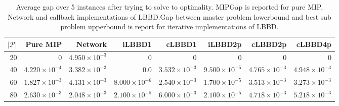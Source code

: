 \begin{table*}
    \centering
    \caption{Average gap over 5 instances after trying to solve to optimality. MIPGap is reported for pure MIP, Network and callback implementations of LBBD.\@ Gap between master problem lowerbound and best sub problem upperbound is report for iterative implementations of LBBD.}
    \begin{tabular}{rrrrrrrr} \toprule
        $|\mathcal{P}|$ & Pure MIP & Network & iLBBD1 & cLBBD1 & iLBBD2p & cLBBD2p & cLBBD4p \\ \midrule
        20              & 0 &    $4.950 \times 10^{-3}$     & 0 &  0 & 0 & 0 & 0 \\
        40              & $4.220 \times 10^{-4}$ & $3.382 \times 10^{-3}$  & 0.0 & $3.532 \times 10^{-3}$ & $9.500 \times 10^{-5}$ & $4.765 \times 10^{-3}$ & $4.948 \times 10^{-3}$ \\
        60 & $1.827 \times 10^{-3}$ & $4.131 \times 10^{-3}$ & $8.000 \times 10^{-6}$ & $2.540 \times 10^{-3}$ & $1.700 \times 10^{-5}$ & $3.513 \times 10^{-3}$ & $3.273 \times 10^{-3}$ \\
        80 &  $2.630 \times 10^{-3}$ &  $2.048 \times 10^{-3}$ & $2.100 \times 10^{-5}$ &  $6.000 \times 10^{-3}$ & $2.100 \times 10^{-5}$ & $4.718 \times 10^{-3}$ & $5.218 \times 10^{-3}$ \\
        \bottomrule
    \end{tabular}
\end{table*}
